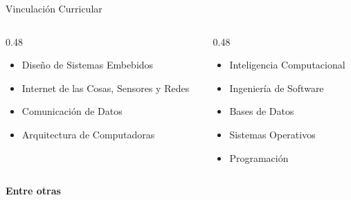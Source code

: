 \documentclass[10pt]{beamer}
\begin{document}
\begin{frame}{Vinculación Curricular}
  \begin{columns}[t]
    \begin{column}{0.48\textwidth}
      \begin{itemize}
        \setlength{\itemsep}{0.8em}
        \item Diseño de Sistemas Embebidos
        \item Internet de las Cosas, Sensores y Redes
        \item Comunicación de Datos
        \item Arquitectura de Computadoras
      \end{itemize}
    \end{column}
    \begin{column}{0.48\textwidth}
      \begin{itemize}
        \setlength{\itemsep}{0.8em}
        \item Inteligencia Computacional
        \item Ingeniería de Software
        \item Bases de Datos
        \item Sistemas Operativos
        \item Programación
      \end{itemize}
    \end{column}
  \end{columns}
  \vspace{1.5em}
  \centering
  \textbf{Entre otras}
\end{frame}
\end{document}
